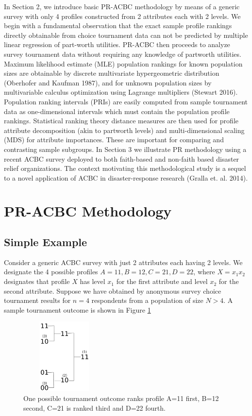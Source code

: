 \documentclass[a4paper, 12pt]{article}
\begin{document}
In Section 2, we introduce basic PR-ACBC methodology by means of a generic survey with only 4 profiles constructed from 2 attributes each with 2 levels. We begin with a fundamental observation that the exact sample profile rankings directly obtainable from choice tournament data can not be predicted by multiple linear regression of part-worth utilities.  PR-ACBC then proceeds to analyze  survey tournament data without requiring any knowledge of partworth utilities.  Maximum likelihood estimate (MLE) population rankings for known population sizes are obtainable by discrete multivariate hypergeometric distribution (Oberhofer and Kaufman 1987), and  for unknown population sizes by multivariable calculus optimization using Lagrange multipliers (Stewart 2016).   Population ranking intervals (PRIs) are easily computed from sample tournament data as one-dimensional intervals which must contain the population profile rankings. Statistical ranking theory distance measures are then used for profile attribute decomposition (akin to partworth levels) and multi-dimensional scaling (MDS) for attribute importances. These are important for comparing and contrasting sample subgroups.  In Section 3 we illustrate PR methodology using a recent ACBC survey deployed to both faith-based and non-faith based disaster relief organizations.    The context motivating this methodological study is a sequel to a novel application of ACBC in disaster-response research (Gralla et. al. 2014).



\section{PR-ACBC Methodology}

\subsection{Simple Example}

Consider a generic ACBC survey with just 2 attributes each having 2 levels. We designate the 4 possible profiles $A=11, B=12, C=21, D=22$, where $X=x_1x_2$ designates that profile $X$ has level $x_1$ for the first attribute and level $x_2$ for the second attribute. Suppose we have obtained by anonymous survey choice tournament results  for $n=4$ respondents from a population of size $N>4$.  A sample tournament outcome is shown in Figure \ref{SimpleTourn}
\begin{figure}[!htpb]
\centering
\includegraphics[width=1.75in, height=1.5in]{SimpleTourn.png}
\caption{One possible tournament outcome ranks profile A=11 first, B=12 second, C=21 is ranked third and D=22 fourth.  }
\label{SimpleTourn}
\end{figure}
\end{document}
